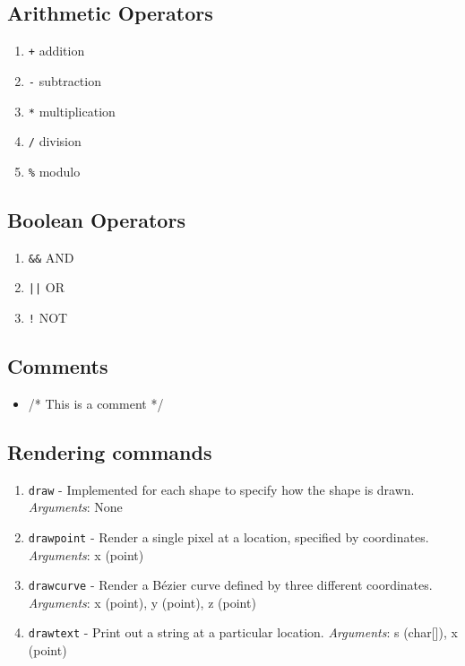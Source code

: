\documentclass[letterpaper,12pt]{article}
\begin{document}
\subsection*{Arithmetic Operators}
\begin{enumerate}
\itemsep0em
\item \texttt{+} \space addition
\item \texttt{-} \space subtraction
\item \texttt{*} \space multiplication
\item \texttt{/} \space division
\item \texttt{\%} \space modulo
\end{enumerate}

\subsection*{Boolean Operators}
\begin{enumerate}
\itemsep0em
\item \texttt{\&\&}  AND
\item \texttt{||}   OR
\item \texttt{!}    NOT
\end{enumerate}

\subsection*{Comments}
\begin{itemize}
\item /* This is a comment */
\end{itemize}

\subsection*{Rendering commands}
\begin{enumerate}
\itemsep0em
\item \texttt{draw} - Implemented for each shape to specify how the shape is drawn.
\textit{Arguments}: None
\item \texttt{drawpoint} - Render a single pixel at a location, specified by coordinates.
\textit{Arguments}: x (point)
\item \texttt{drawcurve} - Render a Bézier curve defined by three different coordinates. 
\textit{Arguments}: x (point), y (point), z (point)
\item \texttt{drawtext} - Print out a string at a particular location.
\textit{Arguments}: s (char[]), x (point)
\end{enumerate}
\end{document}
